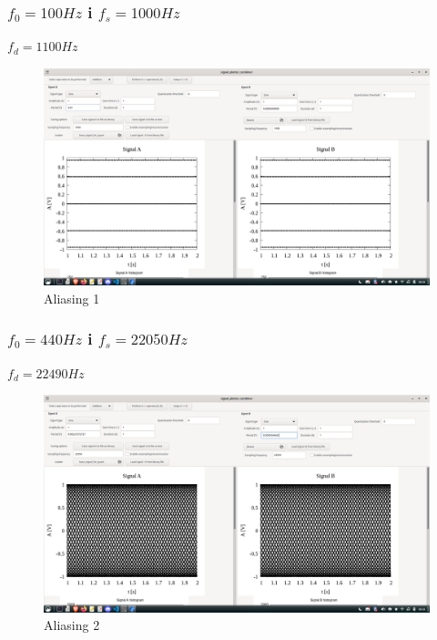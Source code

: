 \documentclass{article}
\begin{document}
\subsubsection{$f_0 = 100Hz$ i $f_s = 1000Hz$}
$f_d = 1100Hz$
\begin{figure}[H]
 \centering
 \includegraphics[width=14cm]{aliasing1.png}
 \vspace{-0.3cm}
 \caption{Aliasing 1}
 \label{fig:al1}
\end{figure}

\subsubsection{$f_0 = 440Hz$ i $f_s = 22050Hz$}
$f_d = 22490Hz$
\begin{figure}[H]
 \centering
 \includegraphics[width=14cm]{aliasing2.png}
 \vspace{-0.3cm}
 \caption{Aliasing 2}
 \label{fig:al2}
\end{figure}
\end{document}
